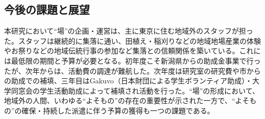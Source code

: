 \documentclass[a4paper]{jsarticle}
\begin{document}
\subsection{今後の課題と展望}
本研究において“場”の企画・運営は、主に東京に住む地域外のスタッフが担った。スタッフは継続的に集落に通い、田植え・稲刈りなどの地域地場産業の体験やお祭りなどの地域伝統行事の参加など集落との信頼関係を築いている。これには最低限の期間と予算が必要となる。初年度こそ新潟県からの助成金事業で行ったが、次年からは、活動費の調達が難航した。次年度は研究室の研究費や市からの助成での補填、三年目はGakuvo（日本財団による学生ボランティア助成）・大学同窓会の学生活動助成によって補填され活動を行った。“場”の形成において、地域外の人間、いわゆる“よそもの”の存在の重要性が示された一方で、“よそもの”の確保・持続した派遣に伴う予算の獲得も一つの課題である。\par


\newpage
\end{document}

